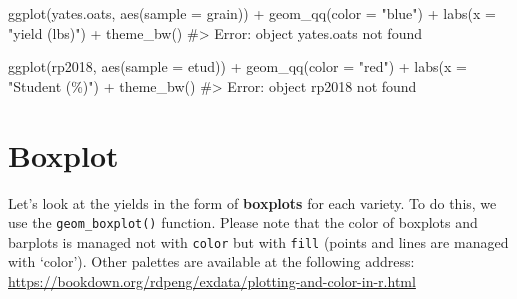 \documentclass[
  letterpaper,
  DIV=11,
  numbers=noendperiod]{scrreprt}
\newenvironment{Shaded}{\begin{snugshade}}{\end{snugshade}}
\newcommand{\AttributeTok}[1]{\textcolor[rgb]{0.40,0.45,0.13}{#1}}
\newcommand{\CommentTok}[1]{\textcolor[rgb]{0.37,0.37,0.37}{#1}}
\newcommand{\FunctionTok}[1]{\textcolor[rgb]{0.28,0.35,0.67}{#1}}
\newcommand{\NormalTok}[1]{\textcolor[rgb]{0.00,0.23,0.31}{#1}}
\newcommand{\SpecialCharTok}[1]{\textcolor[rgb]{0.37,0.37,0.37}{#1}}
\newcommand{\StringTok}[1]{\textcolor[rgb]{0.13,0.47,0.30}{#1}}
\begin{document}
\begin{Shaded}
\begin{Highlighting}[]

\FunctionTok{ggplot}\NormalTok{(yates.oats, }\FunctionTok{aes}\NormalTok{(}\AttributeTok{sample =}\NormalTok{ grain)) }\SpecialCharTok{+}
  \FunctionTok{geom\_qq}\NormalTok{(}\AttributeTok{color =} \StringTok{"blue"}\NormalTok{) }\SpecialCharTok{+}
  \FunctionTok{labs}\NormalTok{(}\AttributeTok{x =} \StringTok{"yield (lbs)"}\NormalTok{) }\SpecialCharTok{+}
  \FunctionTok{theme\_bw}\NormalTok{()}
\CommentTok{\#\textgreater{} Error: object \textquotesingle{}yates.oats\textquotesingle{} not found}

\FunctionTok{ggplot}\NormalTok{(rp2018, }\FunctionTok{aes}\NormalTok{(}\AttributeTok{sample =}\NormalTok{ etud)) }\SpecialCharTok{+}
  \FunctionTok{geom\_qq}\NormalTok{(}\AttributeTok{color =} \StringTok{"red"}\NormalTok{) }\SpecialCharTok{+}
  \FunctionTok{labs}\NormalTok{(}\AttributeTok{x =} \StringTok{"Student (\%)"}\NormalTok{) }\SpecialCharTok{+}
  \FunctionTok{theme\_bw}\NormalTok{()}
\CommentTok{\#\textgreater{} Error: object \textquotesingle{}rp2018\textquotesingle{} not found}
\end{Highlighting}
\end{Shaded}

\section{Boxplot}\label{boxplot}

Let's look at the yields in the form of \textbf{boxplots} for each
variety. To do this, we use the \texttt{geom\_boxplot()} function.
Please note that the color of boxplots and barplots is managed not with
\texttt{color} but with \texttt{fill} (points and lines are managed with
`color'). Other palettes are available at the following address:
\url{https://bookdown.org/rdpeng/exdata/plotting-and-color-in-r.html}
\end{document}
